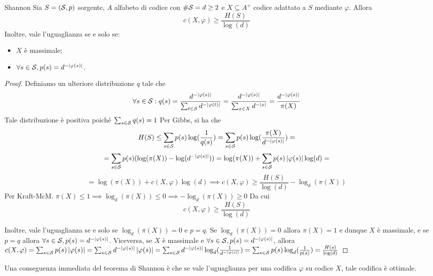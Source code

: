 \begin{theorem}{Shannon}
  Sia \(S = (\mathcal{S},p)\) sorgente, \(A\) alfabeto di codice con \(\#\mathcal{S} = d \geq 2\) e \(X \subseteq A^+\) codice adattato a \(S\) mediante \(\varphi\).
  Allora
  \[c(X,\varphi) \geq \frac{H(S)}{\log(d)}\]
  Inoltre, vale l'uguaglianza se e solo se:
  \begin{itemize}
    \item \(X\) è massimale;
    \item \(\forall s\in \mathcal{S}, p(s) = d^{-\left|\varphi(s)\right|}\).
  \end{itemize}
\end{theorem}
\begin{proof}
  Definiamo un ulteriore distribuzione \(q\) tale che 
  \[\forall s \in \mathcal{S}: q(s) = \frac{d^{-\left|\varphi(s)\right|}}{\sum_{t \in \mathcal{S}} d^{-\left|\varphi(t)\right|}} = \frac{d^{-\left|\varphi(s)\right|}}{\sum_{x\in X} d^{-\left|x\right|}} = \frac{d^{-\left|\varphi(s)\right|}}{\pi(X)}\]
  Tale distribuzione è positiva poiché \(\sum_{s\in\mathcal{S}}q(s) = 1\)
  Per Gibbs, si ha che
  \[H(S) \leq \sum_{s \in \mathcal{S}} p(s) \log(\frac{1}{q(s)}) = \sum_{s \in \mathcal{S}} p(s) \log(\frac{\pi(X)}{d^{-\left|\varphi(s)\right|}}) =\]
  \[= \sum_{s \in \mathcal{S}}p(s)(\log(\pi(X))-\log(d^{-\left|\varphi(s)\right|})) = \log(\pi(X)) + \sum_{s \in \mathcal{S}}p(s)\left|\varphi(s)\right|\log(d) = \]
  \[= \log(\pi(X)) + c(X,\varphi)\log(d) \implies c(X,\varphi) \geq \frac{H(S)}{\log(d)} - \log_{d}(\pi(X))\]
  Per Kraft-McM. \(\pi(X)\leq 1 \implies \log_{d}(\pi(X)) \leq 0 \implies -\log_{d}(\pi(X)) \geq 0\)
  Da cui \[c(X,\varphi) \geq \frac{H(S)}{\log(d)}\]

  Inoltre, vale l'uguaglianza se e solo se \(\log_{d}(\pi(X)) = 0\) e \(p = q\).
  Se \(\log_{d}(\pi(X)) = 0\) allora \(\pi(X) = 1\) e dunque \(X\) è massimale, e se \(p = q\) allora \(\forall s \in \mathcal{S}, p(s) = d^{-\left|\varphi(s)\right|}\).
  Viceversa, se \(X\) è massimale e \(\forall s \in \mathcal{S}, p(s) = d^{-\left|\varphi(s)\right|}\), allora \(c(X,\varphi) = \sum_{s\in\mathcal{S}}p(s)\left|\varphi(s)\right| = \sum_{s\in\mathcal{S}}d^{-\left|\varphi(s)\right|}\left|\varphi(s)\right| = \sum_{s\in \mathcal{S}}d^{-\left|\varphi(s)\right|}\log_{d}(\frac{1}{d^{-\left|\varphi(s)\right|}}) = \sum_{s\in\mathcal{S}} p(s)\log_{d}(\frac{1}{p(s)}) = \frac{H(s)}{\log(d)}\)
\end{proof}

Una conseguenza immediata del teorema di Shannon è che se vale l'uguaglianza per una codifica \(\varphi\) su codice \(X\), tale codifica è ottimale.


